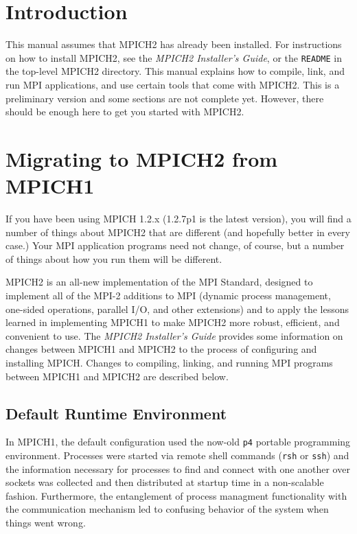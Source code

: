 \documentclass[dvipdfm,11pt]{article}
\begin{document}
\section{Introduction}
\label{sec:introduction}

This manual assumes that MPICH2 has already been installed.  For
instructions on how to install MPICH2, see the \emph{MPICH2 Installer's Guide},
or the \texttt{README} in the top-level MPICH2 directory.  This manual
explains how to compile, link, and run MPI applications, and use certain
tools that come with MPICH2.  This is a preliminary version and some
sections are not complete yet.  However, there should be enough here to
get you started with MPICH2.


\section{Migrating to MPICH2 from MPICH1}
\label{sec:migrating}

If you have been using MPICH 1.2.x (1.2.7p1 is the latest version), you
will find a number of things about MPICH2 that are different (and
hopefully better in every case.)  Your MPI application programs need not
change, of course, but a number of things about how you run them will be
different.

MPICH2 is an all-new implementation of the MPI Standard, designed to
implement all of the MPI-2 additions to MPI (dynamic process management,
one-sided operations, parallel I/O, and other extensions) and to apply
the lessons learned in implementing MPICH1 to make MPICH2 more robust,
efficient, and convenient to use.  The \emph{MPICH2 Installer's Guide}
provides some information on changes between MPICH1 and MPICH2 to the process
of configuring and installing MPICH.  Changes to compiling, linking, and
running MPI programs between MPICH1 and MPICH2 are described below.


\subsection{Default Runtime Environment}
\label{sec:default-environment}

In MPICH1, the default configuration used the now-old \texttt{p4}
portable programming environment.  Processes were started via remote
shell commands (\texttt{rsh} or \texttt{ssh}) and the information
necessary for processes to find and connect with one another over
sockets was collected and then distributed at startup time in a
non-scalable fashion.  Furthermore, the entanglement of process
managment functionality with the communication mechanism led to
confusing behavior of the system when things went wrong.
\end{document}
